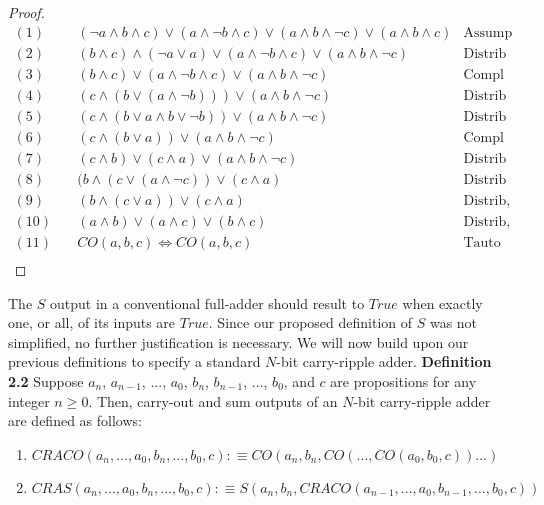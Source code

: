 \documentclass{article}
\begin{document}
\begin{proof}
	\begin{align*}
		(1) &  \quad (\lnot a \land b \land c) \lor (a \land \lnot b \land c) \lor (a \land b \land \lnot c) \lor (a \land b \land c) & \text{Assump} \\
		(2) & \quad (b \land c) \land (\lnot a \lor a) \lor (a \land \lnot b \land c) \lor (a \land b \land \lnot c) & \text{Distrib} \\
		(3) & \quad (b \land c) \lor (a \land \lnot b \land c) \lor (a \land b \land \lnot c) & \text{Compl} \\
		(4) & \quad (c \land (b \lor (a \land \lnot b)))  \lor (a \land b \land \lnot c) & \text{Distrib} \\
		(5) & \quad (c \land (b \lor a \land b \lor \lnot b))  \lor (a \land b \land \lnot c) & \text{Distrib} \\
		(6) & \quad (c \land (b \lor a))  \lor (a \land b \land \lnot c) & \text{Compl} \\
		(7) & \quad (c \land b) \lor (c \land a) \lor (a \land b \land \lnot c) & \text{Distrib} \\
		(8) & \quad (b \land (c \lor (a \land \lnot c)) \lor (c \land a)  & \text{Distrib} \\
		(9) & \quad (b \land (c \lor a)) \lor (c \land a)  & \text{Distrib, Compl} \\
		(10) & \quad  (a \land b) \lor (a \land c) \lor (b \land c) & \text{Distrib, Commut} \\
		(11) & \quad  CO(a, b, c) \iff CO(a, b, c) & \text{Tauto} \\
	\end{align*}
\end{proof}

The $S$ output in a conventional full-adder should result to $True$ when exactly one, or all, of its inputs are $True$. Since our proposed definition of $S$ was not simplified, no further justification is necessary. We will now build upon our previous definitions to specify a standard $N$-bit carry-ripple adder.
\newpage
\noindent \textbf{Definition 2.2} Suppose $a_n$, $a_{n-1}$, $...$, $a_0$, $b_n$, $b_{n-1}$, $...$, $b_0$, and $c$ are propositions for any integer $ n \geq 0$. Then, carry-out and sum outputs of an $N$-bit carry-ripple adder are defined as follows: 
\begin{enumerate}
	\item $ CRACO(a_n, ..., a_0, b_n, ..., b_0, c) :\equiv CO(a_n, b_n, CO(..., CO(a_0, b_0, c))...)$
	\item $ CRAS(a_n, ..., a_0, b_n, ..., b_0, c) :\equiv S(a_n, b_n, CRACO(a_{n-1}, ..., a_0, b_{n-1}, ..., b_0, c)) $
\end{enumerate}
\end{document}
